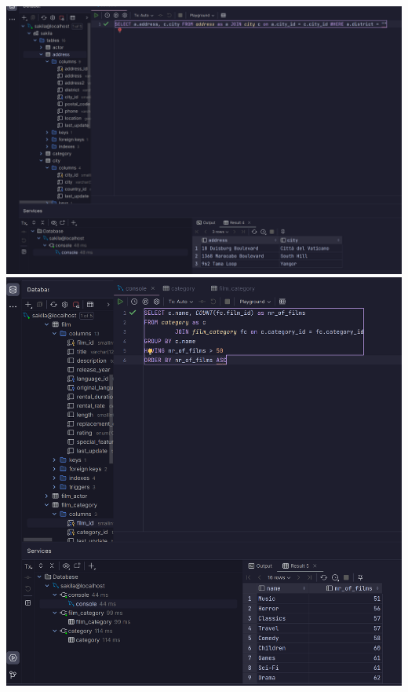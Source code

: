 \documentclass{exam}
\begin{document}
\begin{questions}
	\question
	\includegraphics[width=\textwidth,height=\textheight,keepaspectratio]{question3}
	\question
	\includegraphics[width=\textwidth,height=\textheight,keepaspectratio]{question4}
	\question

\end{questions}
\end{document}

